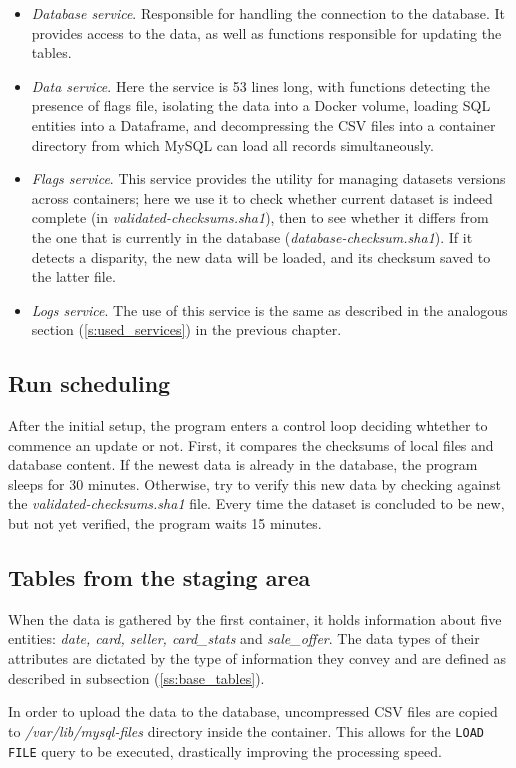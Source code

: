 \begin{itemize}
    \item \textit{Database service}.
          Responsible for handling the connection to the database. It provides access to the data, as well as functions responsible for updating the tables.

    \item \textit{Data service}.
          Here the service is 53 lines long, with functions detecting the presence of flags file, isolating the data into a Docker volume, loading SQL entities into a Dataframe, and decompressing the CSV files into a container directory from which MySQL can load all records simultaneously.

    \item \textit{Flags service}.
          This service provides the utility for managing datasets versions across containers; here we use it to check whether current dataset is indeed complete (in \textit{validated-checksums.sha1}), then to see whether it differs from the one that is currently in the database (\textit{database-checksum.sha1}). If it detects a disparity, the new data will be loaded, and its checksum saved to the latter file.

    \item \textit{Logs service}.
          The use of this service is the same as described in the analogous section (\ref{s:used_services}) in the previous chapter.
\end{itemize}


\subsection{Run scheduling}
After the initial setup, the program enters a control loop deciding whtether to commence an update or not. First, it compares the checksums of local files and database content. If the newest data is already in the database, the program sleeps for 30 minutes. Otherwise, try to verify this new data by checking against the \textit{validated-checksums.sha1} file. Every time the dataset is concluded to be new, but not yet verified, the program waits 15 minutes.

\subsection{Tables from the staging area}
When the data is gathered by the first container, it holds information about five entities: \textit{date, card, seller, card\_stats} and \textit{sale\_offer}. The data types of their attributes are dictated by the type of information they convey and are defined as described in subsection (\ref{ss:base_tables}). \par
In order to upload the data to the database, uncompressed CSV files are copied to \textit{/var/lib/mysql-files} directory inside the container. This allows for the \texttt{LOAD FILE} query to be executed, drastically improving the processing speed.


